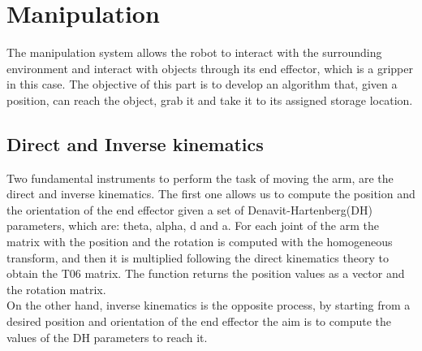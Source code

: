 \documentclass[12pt,a4paper]{article}
\begin{document}
\section{Manipulation}\label{sec:manipulation}
The manipulation system allows the robot to interact with the surrounding environment and interact with objects through its end effector, which is a gripper in this case.
The objective of this part is to develop an algorithm that, given a position, can reach the object, grab it and take it to its assigned storage location.
\subsection{Direct and Inverse kinematics}\label{subsec:kinematics}
Two fundamental instruments to perform the task of moving the arm, are the direct and inverse kinematics. The first one allows us to compute the position and the orientation of the end effector given a set of Denavit-Hartenberg(DH) parameters, which are: theta, alpha, d and a. For each joint of the arm the matrix with the position and the rotation is computed with the homogeneous transform, and then it is multiplied following the direct kinematics theory to obtain the T06 matrix. The function returns the position values as a vector and the rotation matrix.\\
On the other hand, inverse kinematics is the opposite process, by starting from a desired position and orientation of the end effector the aim is to compute the values of the DH parameters to reach it.
\end{document}
